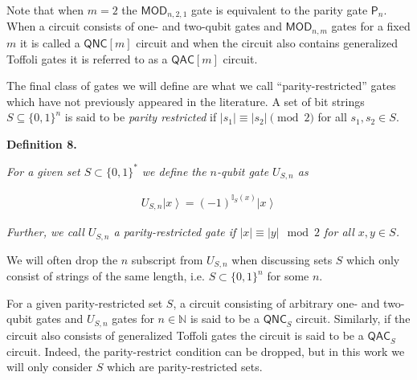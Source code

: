 


Note that when $m=2$ the $\mathsf{MOD}_{n,2,1}$ gate is equivalent to the parity gate $\mathsf{P}_{n}$. When a circuit consists of one- and two-qubit gates and $\mathsf{MOD}_{n,m}$ gates for a fixed $m$ it is called a ${\mathsf{QNC}}[m]$ circuit and when the circuit also contains generalized Toffoli gates it is referred to as a ${\mathsf{QAC}}[m]$ circuit.\par




The final class of gates we will define are what we call “parity-restricted” gates which have not previously appeared in the literature. A set of bit strings $S\subseteq\{0,1\}^{n}$ is said to be \emph{parity restricted} if $|s_{1}|\equiv|s_{2}|\pmod{2}$ for all $s_{1},s_{2}\in S$.\par





\par\medskip\noindent\textbf{
\textbf{Definition 8}\textbf{.}
}\par



\emph{For a given set $S\subset\{0,1\}^{*}$ we define the $n$-qubit gate $U_{S,n}$ as}\par


\[\begin{gathered}
\displaystyle U_{S,n}\left|x\right\rangle=(-1)^{\mathbb{I}_{S}(x)}\left|x\right\rangle
\end{gathered}\]


\emph{Further, we call $U_{S,n}$ a parity-restricted gate if $|x|\equiv|y|\mod{2}$ for all $x,y\in S$.}\par






We will often drop the $n$ subscript from $U_{S,n}$ when discussing sets $S$ which only consist of strings of the same length, i.e. $S\subset\{0,1\}^{n}$ for some $n$.\par




For a given parity-restricted set $S$, a circuit consisting of arbitrary one- and two-qubit gates and $U_{S,n}$ gates for $n\in\mathbb{N}$ is said to be a ${\mathsf{QNC}}_{S}$ circuit. Similarly, if the circuit also consists of generalized Toffoli gates the circuit is said to be a ${\mathsf{QAC}}_{S}$ circuit. Indeed, the parity-restrict condition can be dropped, but in this work we will only consider $S$ which are parity-restricted sets.\par




